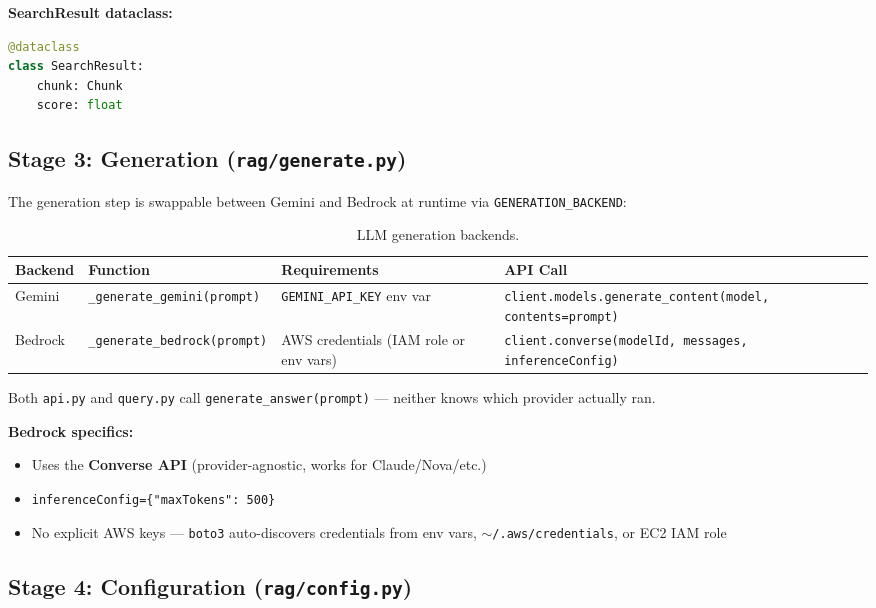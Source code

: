 \documentclass[11pt,a4paper]{paper}
\begin{document}
\textbf{SearchResult dataclass:}

\begin{lstlisting}[language=Python, style=pythonstyle, caption={SearchResult dataclass.}, label=lst:searchresult]
@dataclass
class SearchResult:
    chunk: Chunk
    score: float
\end{lstlisting}

\subsection{Stage 3: Generation (\texttt{rag/generate.py})}

The generation step is swappable between Gemini and Bedrock at runtime via \texttt{GENERATION\_BACKEND}:

\begin{table}[h]
\centering
\small
\begin{tabular}{>{\raggedright}p{2.5cm} >{\raggedright}p{3.0cm} >{\raggedright}p{3.5cm} >{\raggedright\arraybackslash}p{5.5cm}}
\toprule
\textbf{Backend} & \textbf{Function} & \textbf{Requirements} & \textbf{API Call} \\
\midrule
Gemini & \texttt{\_generate\_gemini(prompt)} & \texttt{GEMINI\_API\_KEY} env var & \texttt{client.models.generate\_content(model, contents=prompt)} \\
Bedrock & \texttt{\_generate\_bedrock(prompt)} & AWS credentials (IAM role or env vars) & \texttt{client.converse(modelId, messages, inferenceConfig)} \\
\bottomrule
\end{tabular}
\caption{LLM generation backends.}
\label{tab:backends}
\end{table}

Both \texttt{api.py} and \texttt{query.py} call \texttt{generate\_answer(prompt)} — neither knows which provider actually ran.

\textbf{Bedrock specifics:}
\begin{itemize}
  \item Uses the \textbf{Converse API} (provider-agnostic, works for Claude/Nova/etc.)
  \item \texttt{inferenceConfig=\{"maxTokens": 500\}}
  \item No explicit AWS keys — \texttt{boto3} auto-discovers credentials from env vars, \texttt{$\sim$/.aws/credentials}, or EC2 IAM role
\end{itemize}

\subsection{Stage 4: Configuration (\texttt{rag/config.py})}
\end{document}
